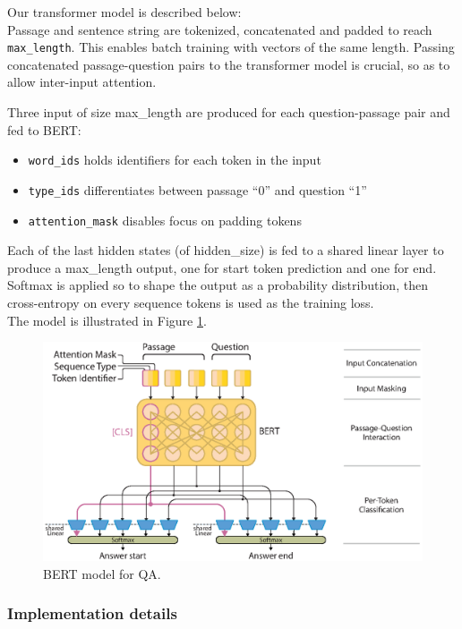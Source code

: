 \documentclass{article}
\newcommand{\code}[1]{\colorbox{light-gray}{\texttt{#1}}}
\begin{document}
Our transformer model is described below:\\

Passage and sentence string are tokenized, concatenated and padded to reach \code{max\_length}.
This enables batch training with vectors of the same length.
Passing concatenated passage-question pairs to the transformer model is crucial, so as to allow inter-input attention.

Three input of size max\_length are produced for each question-passage pair and fed to BERT:

\begin{itemize}
\item \code{word\_ids} holds identifiers for each token in the input
\item \code{type\_ids} differentiates between passage “0” and question “1”
\item \code{attention\_mask} disables focus on padding tokens
\end{itemize}

Each of the last hidden states (of hidden\_size) is fed to a shared linear layer to produce a max\_length output, one for start token prediction and one for end.
Softmax is applied so to shape the output as a probability distribution, then cross-entropy on every sequence tokens is used as the training loss.\\

The model is illustrated in Figure \ref{fig_bert}.
\begin{figure}[h]
\includegraphics[width=\textwidth]{BERT_graph.eps}
\caption{BERT model for QA.} \label{fig_bert}
\end{figure}

\subsubsection{Implementation details}
\end{document}
